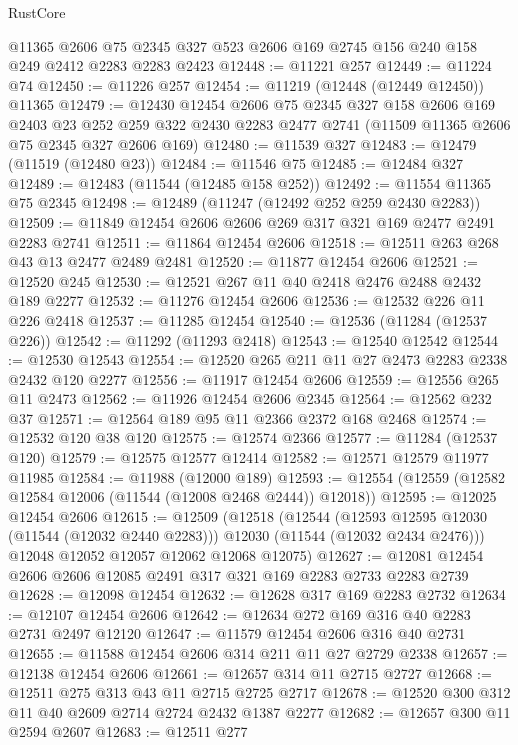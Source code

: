 \begin{lexlean}{RustCore}
\begin{coremodule}
    @11365
    @2606
    @75
    @2345
    @327
    @523
    @2606
    @169
    @2745
    @156
    @240
    @158
    @249
    @2412
    @2283
    @2283
    @2423
@12448 := @11221 @257
@12449 := @11224 @74
@12450 := @11226 @257
@12454 := @11219 (@12448 (@12449 @12450)) @11365
@12479 := @12430
    @12454
    @2606
    @75
    @2345
    @327
    @158
    @2606
    @169
    @2403
    @23
    @252
    @259
    @322
    @2430
    @2283
    @2477
    @2741
    (@11509 @11365 @2606 @75 @2345 @327 @2606 @169)
@12480 := @11539 @327
@12483 := @12479 (@11519 (@12480 @23))
@12484 := @11546 @75
@12485 := @12484 @327
@12489 := @12483 (@11544 (@12485 @158 @252))
@12492 := @11554 @11365 @75 @2345
@12498 := @12489 (@11247 (@12492 @252 @259 @2430 @2283))
@12509 := @11849 @12454 @2606 @2606 @269 @317 @321 @169 @2477 @2491 @2283 @2741
@12511 := @11864 @12454 @2606
@12518 := @12511 @263 @268 @43 @13 @2477 @2489 @2481
@12520 := @11877 @12454 @2606
@12521 := @12520 @245
@12530 := @12521 @267 @11 @40 @2418 @2476 @2488 @2432 @189 @2277
@12532 := @11276 @12454 @2606
@12536 := @12532 @226 @11 @226 @2418
@12537 := @11285 @12454
@12540 := @12536 (@11284 (@12537 @226))
@12542 := @11292 (@11293 @2418)
@12543 := @12540 @12542
@12544 := @12530 @12543
@12554 := @12520 @265 @211 @11 @27 @2473 @2283 @2338 @2432 @120 @2277
@12556 := @11917 @12454 @2606
@12559 := @12556 @265 @11 @2473
@12562 := @11926 @12454 @2606 @2345
@12564 := @12562 @232 @37
@12571 := @12564 @189 @95 @11 @2366 @2372 @168 @2468
@12574 := @12532 @120 @38 @120
@12575 := @12574 @2366
@12577 := @11284 (@12537 @120)
@12579 := @12575 @12577 @12414
@12582 := @12571 @12579 @11977 @11985
@12584 := @11988 (@12000 @189)
@12593 := @12554 (@12559 (@12582 @12584 @12006 (@11544 (@12008 @2468 @2444)) @12018))
@12595 := @12025 @12454 @2606
@12615 := @12509
    (@12518
      (@12544
        (@12593 @12595 @12030 (@11544 (@12032 @2440 @2283)))
        @12030
        (@11544 (@12032 @2434 @2476)))
      @12048
      @12052
      @12057
      @12062
      @12068
      @12075)
@12627 := @12081 @12454 @2606 @2606 @12085 @2491 @317 @321 @169 @2283 @2733 @2283 @2739
@12628 := @12098 @12454
@12632 := @12628 @317 @169 @2283 @2732
@12634 := @12107 @12454 @2606
@12642 := @12634 @272 @169 @316 @40 @2283 @2731 @2497 @12120
@12647 := @11579 @12454 @2606 @316 @40 @2731
@12655 := @11588 @12454 @2606 @314 @211 @11 @27 @2729 @2338
@12657 := @12138 @12454 @2606
@12661 := @12657 @314 @11 @2715 @2727
@12668 := @12511 @275 @313 @43 @11 @2715 @2725 @2717
@12678 := @12520 @300 @312 @11 @40 @2609 @2714 @2724 @2432 @1387 @2277
@12682 := @12657 @300 @11 @2594 @2607
@12683 := @12511 @277

\end{coremodule}
\end{lexlean}
